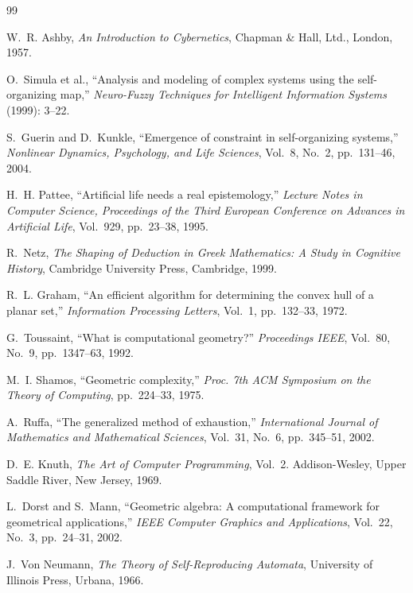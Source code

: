 \documentclass[11pt]{article}
\begin{document}
\begin{thebibliography}{99}

W.~R. Ashby,
\textit{An Introduction to Cybernetics},
Chapman \& Hall, Ltd., London, 1957.

O.~Simula et al.,
``Analysis and modeling of complex systems using the self-organizing map,''
\textit{Neuro-Fuzzy Techniques for Intelligent Information Systems} (1999): 3--22.

S.~Guerin and D.~Kunkle,
``Emergence of constraint in self-organizing systems,''
\textit{Nonlinear Dynamics, Psychology, and Life Sciences},
Vol.~8, No.~2, pp.~131--46, 2004.

H.~H. Pattee,
``Artificial life needs a real epistemology,''
\textit{Lecture Notes in Computer Science, Proceedings of the Third European Conference on Advances in Artificial Life},
Vol.~929, pp.~23--38, 1995.

R.~Netz,
\textit{The Shaping of Deduction in Greek Mathematics: A Study in Cognitive History},
Cambridge University Press, Cambridge, 1999.

R.~L. Graham,
``An efficient algorithm for determining the convex hull of a planar set,''
\textit{Information Processing Letters},
Vol.~1, pp.~132--33, 1972.

G.~Toussaint,
``What is computational geometry?''
\textit{Proceedings IEEE},
Vol.~80, No.~9, pp.~1347--63, 1992.

M.~I. Shamos,
``Geometric complexity,''
\textit{Proc. 7th ACM Symposium on the Theory of Computing},
pp.~224--33, 1975.

A.~Ruffa,
``The generalized method of exhaustion,''
\textit{International Journal of Mathematics and Mathematical Sciences},
Vol.~31, No.~6, pp.~345--51, 2002.

D.~E. Knuth,
\textit{The Art of Computer Programming},
Vol.~2. Addison-Wesley, Upper Saddle River, New Jersey, 1969.

L.~Dorst and S.~Mann,
``Geometric algebra: A computational framework for geometrical applications,''
\textit{IEEE Computer Graphics and Applications},
Vol.~22, No.~3, pp.~24--31, 2002.

J.~Von Neumann,
\textit{The Theory of Self-Reproducing Automata},
University of Illinois Press, Urbana, 1966.


\end{thebibliography}
\end{document}
